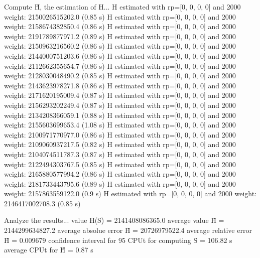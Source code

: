 Compute H̃, the estimation of H...
  H estimated with rp=[0, 0, 0, 0] and 2000 weight:  2150026515202.0  (0.85 s)
  H estimated with rp=[0, 0, 0, 0] and 2000 weight:  2158674382850.4  (0.86 s)
  H estimated with rp=[0, 0, 0, 0] and 2000 weight:  2191789877971.2  (0.89 s)
  H estimated with rp=[0, 0, 0, 0] and 2000 weight:  2150963216560.2  (0.86 s)
  H estimated with rp=[0, 0, 0, 0] and 2000 weight:  2144000751203.6  (0.86 s)
  H estimated with rp=[0, 0, 0, 0] and 2000 weight:  2112662355654.7  (0.86 s)
  H estimated with rp=[0, 0, 0, 0] and 2000 weight:  2128030048490.2  (0.85 s)
  H estimated with rp=[0, 0, 0, 0] and 2000 weight:  2143623978271.8  (0.86 s)
  H estimated with rp=[0, 0, 0, 0] and 2000 weight:  2171620195009.4  (0.87 s)
  H estimated with rp=[0, 0, 0, 0] and 2000 weight:  2156293202249.4  (0.87 s)
  H estimated with rp=[0, 0, 0, 0] and 2000 weight:  2134208366059.1  (0.88 s)
  H estimated with rp=[0, 0, 0, 0] and 2000 weight:  2155603699653.4  (1.08 s)
  H estimated with rp=[0, 0, 0, 0] and 2000 weight:  2100971770977.0  (0.86 s)
  H estimated with rp=[0, 0, 0, 0] and 2000 weight:  2109060937217.5  (0.82 s)
  H estimated with rp=[0, 0, 0, 0] and 2000 weight:  2104074511787.3  (0.87 s)
  H estimated with rp=[0, 0, 0, 0] and 2000 weight:  2122494303767.5  (0.85 s)
  H estimated with rp=[0, 0, 0, 0] and 2000 weight:  2165880577994.2  (0.86 s)
  H estimated with rp=[0, 0, 0, 0] and 2000 weight:  2181733443795.6  (0.89 s)
  H estimated with rp=[0, 0, 0, 0] and 2000 weight:  2157863559122.0  (0.9 s)
  H estimated with rp=[0, 0, 0, 0] and 2000 weight:  2146417002708.3  (0.85 s)

Analyze the results...
  value H(S)                  = 2141408086365.0 
  average value H̃             = 2144299634827.2 
  average absolue error H̃     = 20726979522.4 
  average relative error H̃    = 0.009679 
  confidence interval for 95%
  CPUt for computing S         = 106.82 s
  average CPUt for H̃           = 0.87 s

